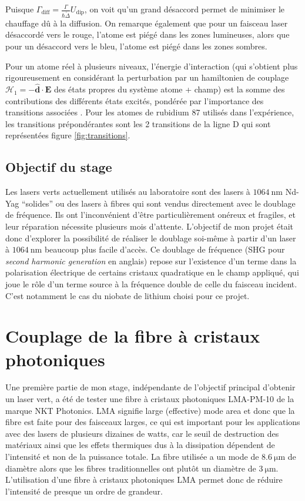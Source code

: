 \documentclass[11pt,a4paper]{article}
\newcommand{\lmbd}[1]{$\SI{#1}{\nano\metre}$}
\newcommand{\mathsc}[1]{\mathrm{\scriptscriptstyle {#1}}}
\renewcommand{\v}[1]{\boldsymbol{\mathbf{#1}}}
\begin{document}
Puisque $\Gamma_\mathsc{diff}=\frac{\Gamma}{\hbar \widetilde{\Delta}} U_\mathsc{dip}$, on voit qu'un grand désaccord permet de minimiser le chauffage dû à la diffusion. On remarque également que pour un faisceau laser désaccordé vers le rouge, l'atome est piégé dans les zones lumineuses, alors que pour un désaccord vers le bleu, l'atome est piégé dans les zones sombres.

Pour un atome réel à plusieurs niveaux, l'énergie d'interaction (qui s'obtient plus rigoureusement en considérant la perturbation par un hamiltonien de couplage $\mathcal H_1 = - \hat{\v d} \cdot \v E$ des états propres du système atome + champ) est la somme des contributions des différents états excités, pondérée par l'importance des transitions associées \citep{grimm}. Pour les atomes de rubidium 87 utilisés dans l'expérience, les transitions prépondérantes sont les 2 transitions de la ligne D qui sont représentées figure \ref{fig:transitions}.


\subsection{Objectif du stage}

Les lasers verts actuellement utilisés au laboratoire sont des lasers à \lmbd{1064} Nd-Yag ``solides'' ou des lasers à fibres qui sont vendus directement avec le doublage de fréquence. Ils ont l'inconvénient d'être particulièrement onéreux et fragiles, et leur réparation nécessite plusieurs mois d'attente. L'objectif de mon projet était donc d'explorer la possibilité de réaliser le doublage soi-même à partir d'un laser à \lmbd{1064} beaucoup plus facile d'accès. Ce doublage de fréquence (SHG pour \textit{second harmonic generation} en anglais) repose sur l'existence d'un terme dans la polarisation électrique de certains cristaux quadratique en le champ appliqué, qui joue le rôle d'un terme source à la fréquence double de celle du faisceau incident. C'est notamment le cas du niobate de lithium choisi pour ce projet. %

\section{Couplage de la fibre à cristaux photoniques}
Une première partie de mon stage, indépendante de l'objectif principal d'obtenir un laser vert, a été de tester une fibre à cristaux photoniques
LMA-PM-10 de la marque NKT Photonics. LMA signifie large (effective) mode area et donc que la fibre est faite pour des faisceaux larges, ce qui est important pour les applications avec des lasers de plusieurs dizaines de watts, car le seuil de destruction des matériaux ainsi que les effets thermiques dus à la dissipation dépendent de l'intensité et non de la puissance totale. La fibre utilisée a un mode de $\SI{8.6}{\micro\meter}$ de diamètre alors que les fibres traditionnelles ont plutôt un diamètre de $\SI{3}{\micro\meter}$. L'utilisation d'une fibre à cristaux photoniques LMA permet donc de réduire l'intensité de presque un ordre de grandeur.
\end{document}
